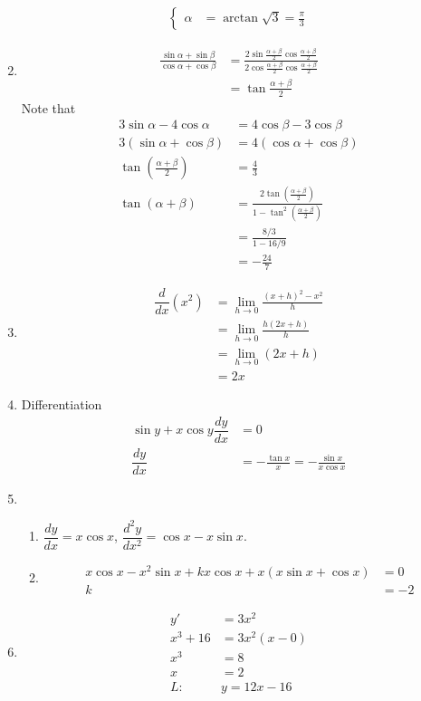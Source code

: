 \documentclass[12pt]{article}
\begin{document}
\begin{enumerate}
\begin{align*}
\begin{cases}
                \alpha&=\arctan{\sqrt{3}}=\frac{\pi}{3}
            \end{cases}
        \end{align*}
        \item \begin{align*}
            \frac{\sin{\alpha}+\sin{\beta}}{\cos{\alpha}+\cos{\beta}}&=\frac{2\sin{\frac{\alpha+\beta}{2}}\cos{\frac{\alpha+\beta}{2}}}{2\cos{\frac{\alpha+\beta}{2}}\cos{\frac{\alpha+\beta}{2}}}\\
            &=\tan{\frac{\alpha+\beta}{2}}
        \end{align*}
        Note that \begin{align*}
            3\sin{\alpha}-4\cos{\alpha}&=4\cos{\beta}-3\cos{\beta}\\
            3(\sin{\alpha}+\cos{\beta})&=4(\cos{\alpha}+\cos{\beta})\\
            \tan(\frac{\alpha+\beta}{2})&=\frac{4}{3}\\
            \tan(\alpha+\beta)&=\frac{2\tan(\frac{\alpha+\beta}{2})}{1-\tan^2(\frac{\alpha+\beta}{2})}\\
            &=\frac{8/3}{1-16/9}\\
            &=-\frac{24}{7}
        \end{align*}
        \item \begin{align*}
            \dfrac{d}{dx}(x^2)&=\lim_{h\to 0}\frac{(x+h)^2-x^2}{h}\\
            &=\lim_{h\to 0}\frac{h(2x+h)}{h}\\
            &=\lim_{h\to 0}(2x+h)\\
            &=2x
        \end{align*}
        \item Differentiation\begin{align*}
            \sin{y}+x\cos{y}\dfrac{dy}{dx}&=0\\
            \dfrac{dy}{dx}&=-\frac{\tan{x}}{x}=-\frac{\sin{x}}{x\cos{x}}
        \end{align*}
        \item \begin{enumerate}
            \item $\dfrac{dy}{dx}=x\cos{x}$, $\dfrac{d^2y}{dx^2}=\cos{x}-x\sin{x}$.
            \item \begin{align*}
                x\cos{x}-x^2\sin{x}+kx\cos{x}+x(x\sin{x}+\cos{x})&=0\\
                k&=-2
            \end{align*}
        \end{enumerate}
        \item \begin{align*}
            y'&=3x^2\\
            x^3+16&=3x^2(x-0)\\
            x^3&=8\\
            x&=2\\
            L:&y=12x-16
        \end{align*}
    \end{enumerate}
\end{document}

